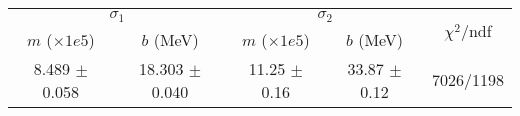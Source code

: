 \begin{tabular}{cc|cc||c}
\multicolumn{2}{c|}{$\sigma_1$} & \multicolumn{2}{|c}{$\sigma_2$} & \multirow{2}{*}{$\chi^2/$ndf} \\
$m$ ($\times1e5$) & $b$ (MeV) & $m$ ($\times1e5$) & $b$ (MeV) & \\
\hline
8.489 $\pm$ 0.058 & 18.303 $\pm$ 0.040 & 11.25 $\pm$ 0.16 & 33.87 $\pm$ 0.12 & 7026/1198\\
\end{tabular}
